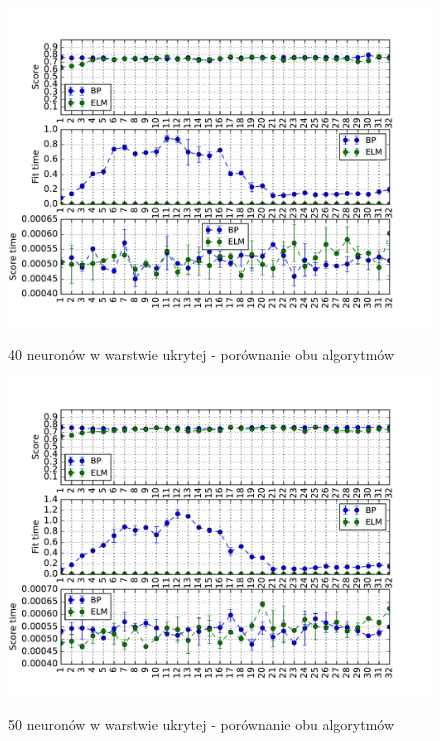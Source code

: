 \begin{figure}[h!]
	\centering
	\includegraphics[width=\linewidth]{img/bp_elm_40.pdf}
	\label{Rysunek}
	\caption{40 neuronów w warstwie ukrytej - porównanie obu algorytmów}
\end{figure}

\begin{figure}[h!]
	\centering
	\includegraphics[width=\linewidth]{img/bp_elm_50.pdf}
	\label{Rysunek}
	\caption{50 neuronów w warstwie ukrytej - porównanie obu algorytmów}
\end{figure}


